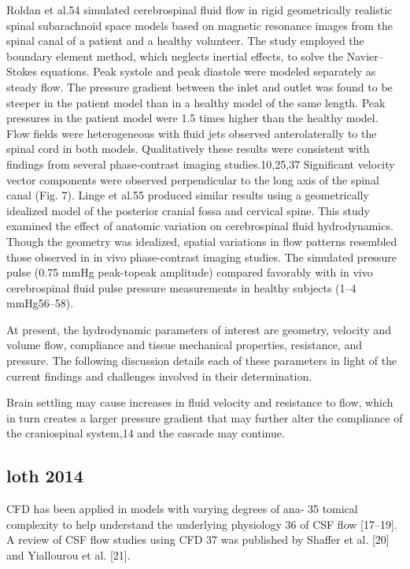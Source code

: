 \documentclass{report}
\begin{document}
Roldan et al.54 simulated
cerebrospinal fluid flow in rigid geometrically
realistic spinal subarachnoid space models based
on magnetic resonance images from the spinal canal
of a patient and a healthy volunteer. The study
employed the boundary element method, which
neglects inertial effects, to solve the Navier–Stokes
equations. Peak systole and peak diastole were
modeled separately as steady flow. The pressure
gradient between the inlet and outlet was found to
be steeper in the patient model than in a healthy
model of the same length. Peak pressures in the
patient model were 1.5 times higher than the healthy
model. Flow fields were heterogeneous with fluid
jets observed anterolaterally to the spinal cord in
both models. Qualitatively these results were consistent
with findings from several phase-contrast
imaging studies.10,25,37 Significant velocity vector
components were observed perpendicular to the
long axis of the spinal canal (Fig. 7). Linge et al.55
produced similar results using a geometrically
idealized model of the posterior cranial fossa and
cervical spine. This study examined the effect of
anatomic variation on cerebrospinal fluid hydrodynamics.
Though the geometry was idealized,
spatial variations in flow patterns resembled those
observed in in vivo phase-contrast imaging studies.
The simulated pressure pulse (0.75 mmHg peak-topeak
amplitude) compared favorably with in vivo
cerebrospinal fluid pulse pressure measurements in
healthy subjects (1–4 mmHg56–58).

At present, the hydrodynamic parameters of interest
are geometry, velocity and volume flow, compliance
and tissue mechanical properties, resistance, and
pressure. The following discussion details each of
these parameters in light of the current findings and
challenges involved in their determination.

Brain settling may cause increases in fluid
velocity and resistance to flow, which in turn creates a
larger pressure gradient that may further alter the
compliance of the craniospinal system,14 and the
cascade may continue.

\subsection{loth 2014}
CFD has been applied in models with varying degrees of ana-
35 tomical complexity to help understand the underlying physiology
36 of CSF flow [17–19]. A review of CSF flow studies using CFD
37 was published by Shaffer et al. [20] and Yiallourou et al. [21].
\end{document}

